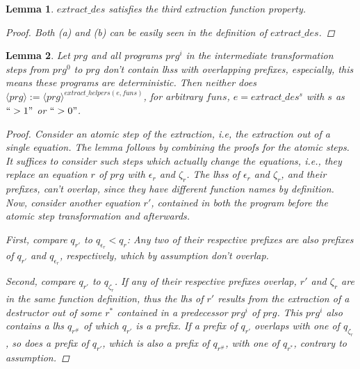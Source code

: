 \documentclass[11pt]{article} %
\newtheorem*{lemma*}{Lemma}
\begin{document}
\begin{framed}
\begin{lemma*}
$extract\_des$ satisfies the third extraction function property.

\begin{proof}

Both (a) and (b) can be easily seen in the definition of $extract\_des$.

\end{proof}

\end{lemma*}

\begin{lemma*}

Let $prg$ and all programs $prg^i$ in the intermediate transformation steps from $prg^0$ to $prg$ don't contain lhss with overlapping prefixes, especially, this means these programs are deterministic. Then neither does $\langle prg \rangle := \langle prg \rangle^{extract\_helpers(e, funs)}$, for arbitrary $funs$, $e = extract\_des^s$ with $s$ as $`` >1 "$ or $`` >0 "$.

\begin{proof}

Consider an atomic step of the extraction, i.e, the extraction out of a single equation. The lemma follows by combining the proofs for the atomic steps. It suffices to consider such steps which actually change the equations, i.e., they replace an equation $r$ of $prg$ with $\epsilon_r$ and $\zeta_r$. The lhss of $\epsilon_r$ and $\zeta_r$, and their prefixes, can't overlap, since they have different function names by definition. Now, consider another equation $r'$, contained in both the program before the atomic step transformation and afterwards.

First, compare $q_{r'}$ to $q_{\epsilon_r} < q_r$: Any two of their respective prefixes are also prefixes of $q_{r'}$ and $q_{\epsilon_r}$, respectively, which by assumption don't overlap.

Second, compare $q_{r'}$ to $q_{\zeta_r}$. If any of their respective prefixes overlap, $r'$ and $\zeta_r$ are in the same function definition, thus the lhs of $r'$ results from the extraction of a destructor out of some $r^*$ contained in a predecessor $prg^i$ of $prg$. This $prg^i$ also contains a lhs $q_{r^\#}$ of which $q_{r'}$ is a prefix. If a prefix of $q_{r'}$ overlaps with one of $q_{\zeta_r}$, so does a prefix of $q_{r'}$, which is also a prefix of $q_{r^\#}$, with one of $q_{r^*}$, contrary to assumption.

\end{proof}

\end{lemma*}


\end{framed}
\end{document}
